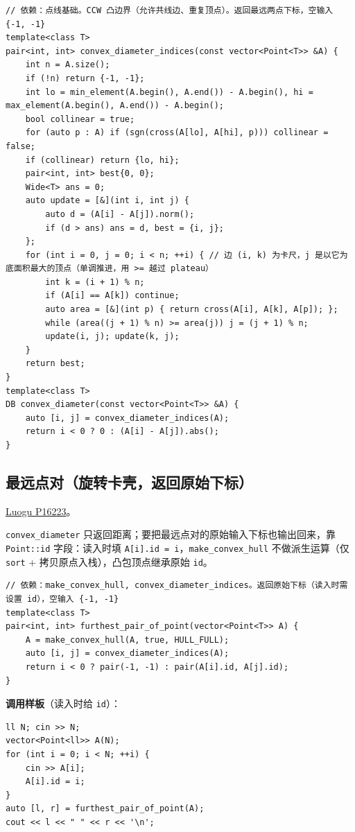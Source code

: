 \begin{verbatim}
// 依赖：点线基础。CCW 凸边界（允许共线边、重复顶点）。返回最远两点下标，空输入 {-1, -1}
template<class T>
pair<int, int> convex_diameter_indices(const vector<Point<T>> &A) {
	int n = A.size();
	if (!n) return {-1, -1};
	int lo = min_element(A.begin(), A.end()) - A.begin(), hi = max_element(A.begin(), A.end()) - A.begin();
	bool collinear = true;
	for (auto p : A) if (sgn(cross(A[lo], A[hi], p))) collinear = false;
	if (collinear) return {lo, hi};
	pair<int, int> best{0, 0};
	Wide<T> ans = 0;
	auto update = [&](int i, int j) {
		auto d = (A[i] - A[j]).norm();
		if (d > ans) ans = d, best = {i, j};
	};
	for (int i = 0, j = 0; i < n; ++i) { // 边 (i, k) 为卡尺，j 是以它为底面积最大的顶点（单调推进，用 >= 越过 plateau）
		int k = (i + 1) % n;
		if (A[i] == A[k]) continue;
		auto area = [&](int p) { return cross(A[i], A[k], A[p]); };
		while (area((j + 1) % n) >= area(j)) j = (j + 1) % n;
		update(i, j); update(k, j);
	}
	return best;
}
template<class T>
DB convex_diameter(const vector<Point<T>> &A) {
	auto [i, j] = convex_diameter_indices(A);
	return i < 0 ? 0 : (A[i] - A[j]).abs();
}
\end{verbatim}

		\subsection{最远点对（旋转卡壳，返回原始下标）}

		\href{https://www.luogu.com.cn/problem/P16223}{Luogu P16223}。

		\texttt{convex\_diameter} 只返回距离；要把最远点对的原始输入下标也输出回来，靠 \texttt{Point::id} 字段：读入时填 \texttt{A[i].id = i}，\texttt{make\_convex\_hull} 不做派生运算（仅 \texttt{sort} + 拷贝原点入栈），凸包顶点继承原始 \texttt{id}。

\begin{verbatim}
// 依赖：make_convex_hull, convex_diameter_indices。返回原始下标（读入时需设置 id），空输入 {-1, -1}
template<class T>
pair<int, int> furthest_pair_of_point(vector<Point<T>> A) {
	A = make_convex_hull(A, true, HULL_FULL);
	auto [i, j] = convex_diameter_indices(A);
	return i < 0 ? pair(-1, -1) : pair(A[i].id, A[j].id);
}
\end{verbatim}

		\textbf{调用样板}（读入时给 \texttt{id}）：
		\begin{verbatim}
ll N; cin >> N;
vector<Point<ll>> A(N);
for (int i = 0; i < N; ++i) {
	cin >> A[i];
	A[i].id = i;
}
auto [l, r] = furthest_pair_of_point(A);
cout << l << " " << r << '\n';
		\end{verbatim}


